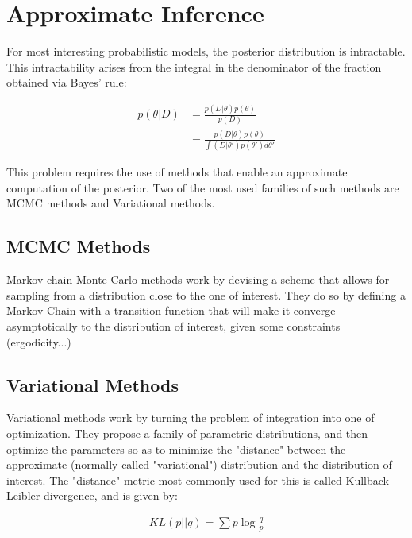 \chapter{Approximate Inference}
\label{chapter:approximateinference}

For most interesting probabilistic models, the posterior distribution is
intractable. This intractability arises from the integral in the denominator
of the fraction obtained via Bayes' rule:

\begin{align}
    p(\theta|D) &= \frac{p(D|\theta)p(\theta)}{p(D)} \\
                &= \frac{p(D|\theta)p(\theta)}{\int(D|\theta')p(\theta') d\theta'}
\end{align}

This problem requires the use of methods that enable an approximate computation
of the posterior. Two of the most used families of such methods are MCMC methods
and Variational methods.

\section{MCMC Methods}
Markov-chain Monte-Carlo methods work by devising a scheme that allows for
sampling from a distribution close to the one of interest. They do so by
defining a Markov-Chain with a transition function that will make it converge
asymptotically to the distribution of interest, given some constraints
(ergodicity...)

\section{Variational Methods}
Variational methods work by turning the problem of integration into one of
optimization. They propose a family of parametric distributions, and then
optimize the parameters so as to minimize the "distance" between the approximate
(normally called "variational") distribution and the distribution of interest.
The "distance" metric most commonly used for this is called Kullback-Leibler
divergence, and is given by:

\begin{align}
    KL(p||q) = \sum p \log\frac{q}{p}
\end{align}
